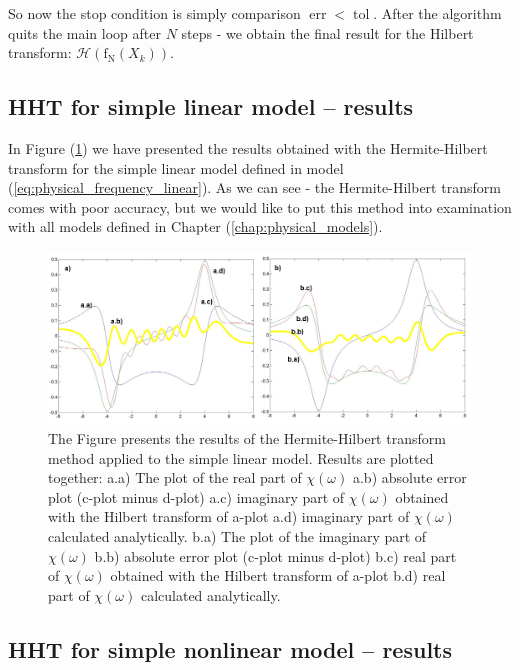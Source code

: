 \documentclass[12pt,twoside,a4paper]{article}
\numberwithin{equation}{subsection}
\numberwithin{figure}{subsection}
\begin{document}
So now the stop condition is simply comparison $\mathop{\mathrm{err}}  < \mathop{\mathrm{tol}} $. After the algorithm quits the main loop after $N$ steps - we obtain the final result for the Hilbert transform: $\mathcal{H} (\mathrm{f_N}(X_k))$.

\subsection{HHT for simple linear model -- results} \label{chap:hermite_lin}

In Figure (\ref{fig:hht_lin}) we have presented the results obtained with the Hermite-Hilbert transform for the simple linear model defined in model (\ref{eq:physical_frequency_linear}). As we can see - the Hermite-Hilbert transform comes with poor accuracy, but we would like to put this method into examination with all models defined in Chapter (\ref{chap:physical_models}).

\begin{figure} 
  \includegraphics[width=150mm]{img/hht_lin.png}
  \caption{ The Figure presents the results of the Hermite-Hilbert transform method applied to the simple linear model. Results are plotted together: 
   a.a) The plot of the real part of $\chi (\omega )$ 
   a.b) absolute error plot (c-plot minus d-plot) 
   a.c) imaginary part of $\chi (\omega )$ obtained with the Hilbert transform of a-plot 
   a.d) imaginary part of $\chi (\omega )$  calculated analytically. 
   b.a) The plot of the imaginary part of $\chi (\omega )$ 
   b.b) absolute error plot (c-plot minus d-plot) 
   b.c) real part of $\chi (\omega )$ obtained with the Hilbert transform of a-plot 
   b.d) real part of $\chi (\omega )$ calculated analytically. \label{fig:hht_lin}
  }
\end{figure}

\subsection{HHT for simple nonlinear model -- results} \label{chap:hermite_nlo}
\end{document}
